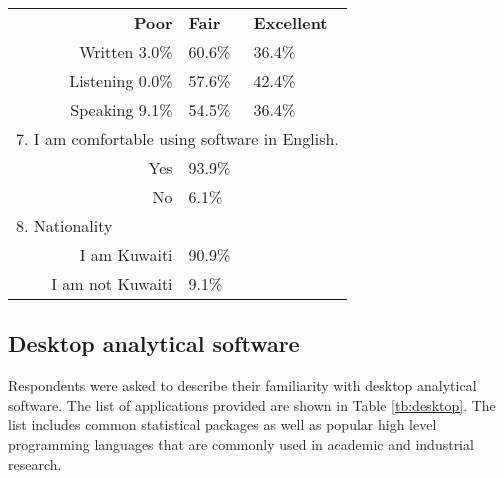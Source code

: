 \begin{table}[!htpb]
{\begin{tabular}{@{}lrll@{}}
 & \textbf{Poor} & \textbf{Fair} & \textbf{Excellent} \\
 &Written 3.0\% & 60.6\% & 36.4\% \\
 &Listening  0.0\% & 57.6\% & 42.4\% \\
 &Speaking  9.1\% & 54.5\% & 36.4\% \\
\multicolumn{4}{l}{7. I am comfortable using software in English.} \\
 & Yes & 93.9\% &  \\
 & No & 6.1\% &  \\
\multicolumn{4}{l}{8. Nationality} \\
 & I am Kuwaiti & 90.9\% &  \\
 & I am not Kuwaiti & 9.1\% &  \\ \bottomrule
\end{tabular}
} %
\end{table}

\subsection{Desktop analytical software}
Respondents were asked to describe their familiarity with desktop  analytical software. The list of applications provided are shown in Table \ref{tb:desktop}. The list includes common statistical packages as well as popular high level programming languages that are commonly used in academic and industrial research. 

\begin{table}[!htpb]
\centering
\caption{Desk top results}
\label{tb:desktop}
\end{table}

